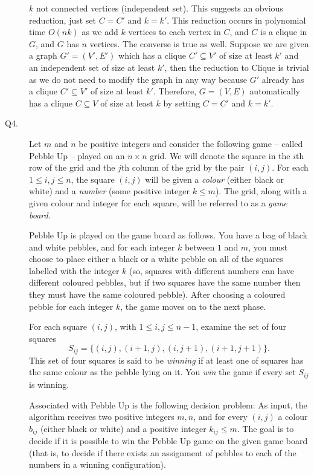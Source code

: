 \documentclass{csc_assignment}
\begin{document}
\begin{description}
$k$ not connected vertices (independent set). This suggests an obvious reduction, just set $C = C'$ and $k = k'$. This reduction occurs in polynomial time $O(nk)$ as we add $k$ vertices to each vertex in $C$, and $C$ is a clique in $G$, and $G$ has $n$ vertices. The converse is true as well. Suppose we are given a graph $G' = (V', E')$ which has a clique $C' \subseteq V'$ of size at least $k'$ and an independent set of size at least $k'$, then the reduction to Clique is trivial as we do not need to modify the graph in any way because $G'$ already has a clique $C' \subseteq V'$ of size at least $k'$. Therefore, $G = (V, E)$ automatically has a clique $C \subseteq V$ of size at least $k$ by setting $C = C'$ and $k = k'$.

\newpage
\item[Q4.]
  Let $m$ and $n$ be positive integers and consider the following game -- called Pebble Up -- played on an $n \times n$ grid.
  We will denote the square in the $i$th row of the grid and the $j$th column of the grid by the pair $(i, j)$.
  For each $1 \leq i, j \leq n$, the square $(i, j)$ will be given a \emph{colour} (either black or white) and a \emph{number} (some positive integer $k \leq m$).
  The grid, along with a given colour and integer for each square, will be referred to as a \emph{game board}.
  
  Pebble Up is played on the game board as follows.
  You have a bag of black and white pebbles, and for each integer $k$ between $1$ and $m$, you must choose to place either a black or a white pebble on all of the squares labelled with the integer $k$ (so, squares with different numbers can have different coloured pebbles, but if two squares have the same number then they must have the same coloured pebble).
  After choosing a coloured pebble for each integer $k$, the game moves on to the next phase.

  For each square $(i, j)$, with $1 \leq i, j \leq n - 1$, examine the set of four squares \[S_{ij} = \{(i, j), (i+1, j), (i, j+1), (i+1, j+1)\}.\]
  This set of four squares is said to be \emph{winning} if at least one of squares has the same colour as the pebble lying on it.
  You \emph{win} the game if every set $S_{ij}$ is winning.

  Associated with Pebble Up is the following decision problem:
  As input, the algorithm receives two positive integers $m, n$, and for every $(i,j)$ a colour $b_{ij}$ (either black or white) and a positive integer $k_{ij} \leq m$.
  The goal is to decide if it is possible to win the Pebble Up game on the given game board (that is, to decide if there exists an assignment of pebbles to each of the numbers in a winning configuration).


\end{description}
\end{document}
